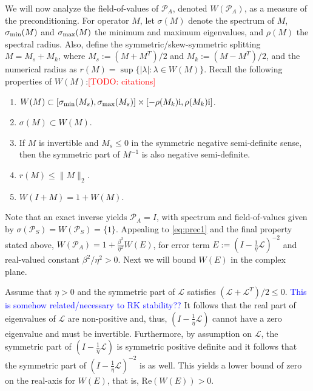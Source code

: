 \documentclass[a4paper,10pt]{article}
\makeatletter
\newcommand{\tcb}{\textcolor{blue}}
\newcommand{\todo}[1]{\textcolor{red}{[TODO\@: #1]}}
\makeatother
\begin{document}
We will now analyze the field-of-values of $\mathcal{P}_A$, denoted $W(\mathcal{P}_A)$,
as a measure of the preconditioning. For operator $M$, let $\sigma(M)$ denote the spectrum of $M$,
$\sigma_{\textnormal{min}}(M)$ and $\sigma_{\textnormal{max}}(M)$ the minimum and maximum eigenvalues, and $\rho(M)$
the spectral radius. Also, define the symmetric/skew-symmetric splitting
$M = M_s + M_k$, where $M_s := (M+M^T)/2$ and $M_k := (M - M^T)/2$, and the numerical
radius as $r(M) = \sup \{ |\lambda| : \lambda \in W(M) \}$. Recall
the following properties of $W(M)$:\todo{citations}
%
\begin{enumerate}
	\item $W(M)\subset [\sigma_{\textnormal{min}}(M_s), \sigma_{\textnormal{max}}(M_s)] \times
	[-\rho(M_k)\mathrm{i}, \rho(M_k)\mathrm{i}]$.

	\item $\sigma(M) \subset W(M)$.

	\item If $M$ is invertible and $M_s \leq 0$ in the symmetric negative semi-definite
	sense, then the symmetric part of $M^{-1}$ is also negative semi-definite.

	\item $r(M) \leq \|M\|_2$.

	\item $W(I + M) = 1 + W(M)$.
\end{enumerate}
%
Note that an exact inverse yields $\mathcal{P}_A = I$, with spectrum
and field-of-values given by $\sigma(\mathcal{P}_S) = W(\mathcal{P}_S) = \{1\}$.
Appealing to \eqref{eq:prec1} and the final property stated above, $W(\mathcal{P}_A)
= 1 + \tfrac{\beta^2}{\eta^2}W(E)$, for error term $E := (I - \tfrac{1}{\eta}\mathcal{L})^{-2}$
and real-valued constant $\beta^2/\eta^2 > 0$. Next we will bound $W(E)$ in the complex plane.

Assume that $\eta > 0$ and the symmetric part of $\mathcal{L}$ satisfies
$(\mathcal{L}+\mathcal{L}^T)/2 \leq 0$.
\tcb{This is somehow related/necessary to RK stability??}
It follows that the real part of eigenvalues of $\mathcal{L}$ are non-positive and,
thus, $(I - \tfrac{1}{\eta}\mathcal{L})$ cannot have a zero eigenvalue and must be
invertible. Furthermore, by assumption on $\mathcal{L}$, the symmetric part of
$(I - \tfrac{1}{\eta}\mathcal{L})$ is symmetric positive definite and it follows
that the symmetric part of $(I - \tfrac{1}{\eta}\mathcal{L})^{-2}$ is as well.
This yields a lower bound of zero on the real-axis for $W(E)$, that is,
Re$(W(E)) > 0$. 
\end{document}
